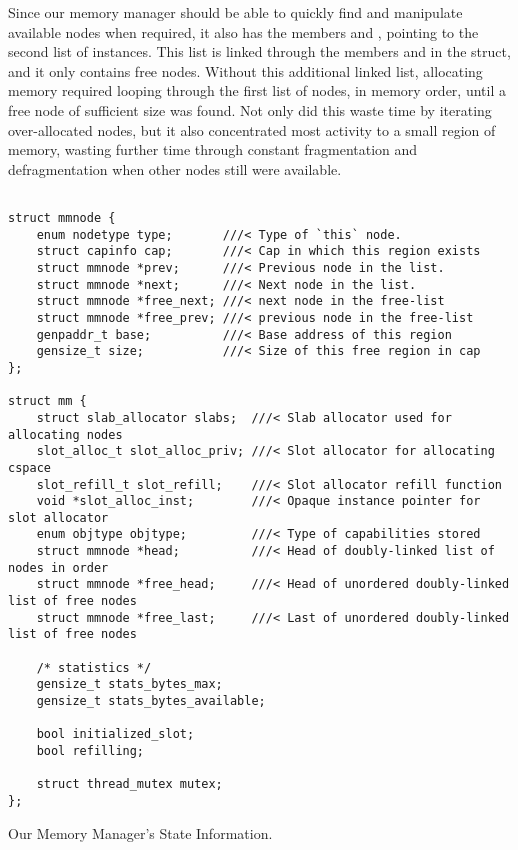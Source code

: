 Since our memory manager should be able to quickly find and manipulate available nodes when required, it also has the members  and , pointing to the second list of  instances. This list is linked through the members  and  in the  struct, and it only contains free nodes. Without this additional linked list, allocating memory required looping through the first list of nodes, in memory order, until a free node of sufficient size was found. Not only did this waste time by iterating over-allocated nodes, but it also concentrated most activity to a small region of memory, wasting further time through constant fragmentation and defragmentation when other nodes still were available.
\begin{code}
\begin{mdframed}[style=myframe]


\begin{verbatim}

struct mmnode {
    enum nodetype type;       ///< Type of `this` node.
    struct capinfo cap;       ///< Cap in which this region exists
    struct mmnode *prev;      ///< Previous node in the list.
    struct mmnode *next;      ///< Next node in the list.
    struct mmnode *free_next; ///< next node in the free-list
    struct mmnode *free_prev; ///< previous node in the free-list
    genpaddr_t base;          ///< Base address of this region
    gensize_t size;           ///< Size of this free region in cap
};

struct mm {
    struct slab_allocator slabs;  ///< Slab allocator used for allocating nodes
    slot_alloc_t slot_alloc_priv; ///< Slot allocator for allocating cspace
    slot_refill_t slot_refill;    ///< Slot allocator refill function
    void *slot_alloc_inst;        ///< Opaque instance pointer for slot allocator
    enum objtype objtype;         ///< Type of capabilities stored
    struct mmnode *head;          ///< Head of doubly-linked list of nodes in order
    struct mmnode *free_head;     ///< Head of unordered doubly-linked list of free nodes
    struct mmnode *free_last;     ///< Last of unordered doubly-linked list of free nodes

    /* statistics */
    gensize_t stats_bytes_max;
    gensize_t stats_bytes_available;

    bool initialized_slot;
    bool refilling;

    struct thread_mutex mutex;
};
\end{verbatim}
\end{mdframed}
\caption{Our Memory Manager's State Information.}
\label{code:mm_state}
\end{code}
